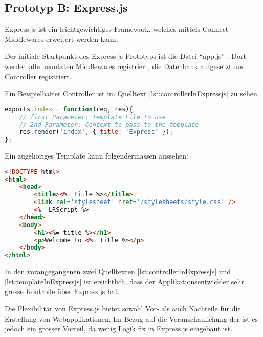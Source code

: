 \newpage
\subsection{Prototyp B: Express.js}

Express.js \cite{Expressjs} ist ein leichtgewichtiges Framework, welches mittels Connect-Middlewares \cite{connect} erweitert werden kann.

Der initiale Startpunkt des Express.js Prototyps ist die Datei ``app.js'' \cite{ExpressjsPrototypAppjs}. Dort werden alle benutzten Middlewares registriert, die Datenbank aufgesetzt und Controller registriert.

Ein Beispielhafter Controller ist im Quelltext \ref{lst:controllerInExpressjs} zu sehen.

\begin{lstlisting}[language=JavaScript, caption=Beispiel eines Controllers in Express.js, label=lst:controllerInExpressjs]
exports.index = function(req, res){
	// first Parameter: Template File to use
	// 2nd Parameter: Context to pass to the template
	res.render('index', { title: 'Express' });
};
\end{lstlisting}

Ein zugehöriges Template kann folgendermassen aussehen:

\begin{lstlisting}[language=HTML, caption=Template in Express.js, label=lst:templateInExpressjs]
<!DOCTYPE html>
<html>
	<head>
		<title><%= title %></title>
		<link rel='stylesheet' href='/stylesheets/style.css' />
		<%- LRScript %>
	</head>
	<body>
		<h1><%= title %></h1>
		<p>Welcome to <%= title %></p>
	</body>
</html>
\end{lstlisting}

In den vorangegangenen zwei Quelltexten \ref{lst:controllerInExpressjs} und \ref{lst:templateInExpressjs} ist ersichtlich, dass der Applikationsentwickler sehr grosse Kontrolle über Express.js hat.

Die Flexibilität von Express.js bietet sowohl Vor- als auch Nachteile für die Erstellung von Webapplikationen. Im Bezug auf die Veranschaulichung der  ist es jedoch ein grosser Vorteil, da wenig Logik fix in Express.js eingebaut ist.